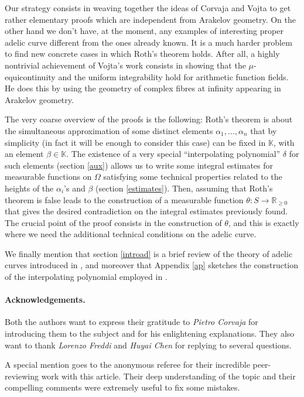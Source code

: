 \documentclass[10 pt,a4paper]{article}
\theoremstyle{plain}
\theoremstyle{definition}
\theoremstyle{named}
\begin{document}
Our strategy consists  in weaving together the ideas of Corvaja and Vojta to get  rather elementary proofs which are independent from Arakelov geometry. On the other hand we don't have, at the moment, any examples of interesting proper adelic curve different from the ones already known. It is a much harder problem to find new concrete cases in which Roth's theorem holds. After all, a highly nontrivial  achievement of Vojta's work consists in showing that the $\mu$-equicontinuity   and the uniform integrability hold  for arithmetic function fields. He does this by using the geometry  of complex fibres at infinity  appearing in Arakelov geometry.


 The very coarse overview of the proofs is the following: Roth's theorem is about the simultaneous approximation of some distinct elements $\alpha_1,\ldots, \alpha_n$ that by simplicity (in fact it will be enough to consider this case) can be fixed in $\mathbb K$, with an element $\beta\in\mathbb K$. The existence of a very special ``interpolating polynomial'' $\delta$ for such elements (section \ref{aux}) allows us to write some  integral estimates  for  measurable functions  on $\Omega$  satisfying some technical properties related to the heights of the $\alpha_i$'s and $\beta$ (section \ref{estimates}). Then, assuming  that Roth's theorem is false  leads to the construction  of a measurable function $\theta:S\to\mathbb R_{\ge 0}$ that gives the desired contradiction on the integral estimates previously found. The crucial point of the proof consists in the construction of $\theta$, and this is exactly where we need the additional technical conditions on the adelic curve. 


We finally mention that section \ref{introad} is a brief review of the theory of adelic curves introduced  in \cite{Ch-Mo}, and moreover that Appendix \ref{ap} sketches the construction of the interpolating polynomial employed in \cite{C}.



\paragraph{Acknowledgements.} Both the authors want to express their gratitude to \emph{Pietro Corvaja} for introducing them to the subject and for his enlightening explanations. They also want to thank \emph{Lorenzo Freddi} and \emph{Huyai Chen} for replying to several questions.

A special mention goes to the anonymous referee for their incredible peer-reviewing work with this article. Their deep understanding of the topic and their compelling comments  were extremely useful to fix some mistakes.
\end{document}
